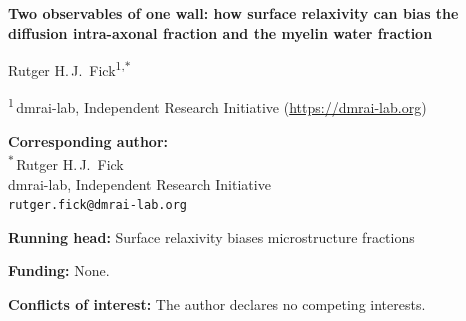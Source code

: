 \documentclass[12pt]{article}
\begin{document}
\begin{titlepage}
\begin{flushleft}
{\LARGE\bfseries
Two observables of one wall: how surface relaxivity can bias the diffusion
intra-axonal fraction and the myelin water fraction\par}
\vspace{1.5em}

{\large Rutger H.\,J.\ Fick\textsuperscript{1,$\ast$}\par}
\vspace{1em}

\textsuperscript{1}\,dmrai-lab, Independent Research Initiative
(\url{https://dmrai-lab.org})\par
\vspace{2em}

\textbf{Corresponding author:}\\
\textsuperscript{$\ast$}\,Rutger H.\,J.\ Fick\\
dmrai-lab, Independent Research Initiative\\
\texttt{rutger.fick@dmrai-lab.org}\par
\vspace{2em}

\textbf{Running head:}\; Surface relaxivity biases microstructure fractions\par
\vspace{2em}

\textbf{Funding:}\; None.\par
\vspace{0.5em}
\textbf{Conflicts of interest:}\; The author declares no competing interests.\par
\end{flushleft}
\end{titlepage}









\end{document}
